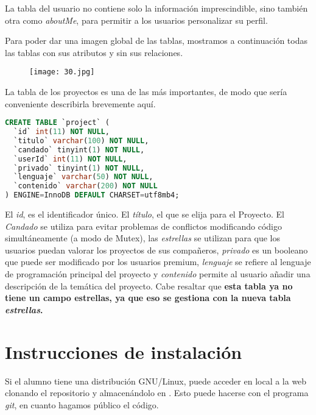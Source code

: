 \documentclass[12pt]{report}
\begin{document}
La tabla del usuario no contiene solo la información imprescindible, sino también otra como \textit{aboutMe}, para permitir a los usuarios personalizar su perfil.

Para poder dar una imagen global de las tablas, mostramos a continuación todas las tablas con sus atributos y sin sus relaciones.

\begin{figure}[!h]
 \centering
  \texttt{[image: 30.jpg]}
\end{figure}

La tabla de los proyectos es una de las más importantes, de modo que sería conveniente describirla brevemente aquí.

\begin{lstlisting}[language=SQL]
CREATE TABLE `project` (
  `id` int(11) NOT NULL,
  `titulo` varchar(100) NOT NULL,
  `candado` tinyint(1) NOT NULL,
  `userId` int(11) NOT NULL,
  `privado` tinyint(1) NOT NULL,
  `lenguaje` varchar(50) NOT NULL,
  `contenido` varchar(200) NOT NULL
) ENGINE=InnoDB DEFAULT CHARSET=utf8mb4;

\end{lstlisting}

El \textit{id}, es el identificador único. El \textit{título}, el que se elija para el Proyecto. El \textit{Candado} se utiliza para evitar problemas de conflictos modificando código simultáneamente (a modo de Mutex), las \textit{estrellas} se utilizan para que los usuarios puedan valorar los proyectos de sus compañeros, \textit{privado} es un booleano que puede ser modificado por los usuarios premium, \textit{lenguaje} se refiere al lenguaje de programación principal del proyecto y \textit{contenido} permite al usuario añadir una descripción de la temática del proyecto. Cabe resaltar que \textbf{esta tabla ya no tiene un campo estrellas, ya que eso se gestiona con la nueva tabla \textit{estrellas}.}


\section{Instrucciones de instalación}

Si el alumno tiene una distribución GNU/Linux, puede acceder en local a la web clonando el repositorio y almacenándolo en . Esto puede hacerse con el programa \textit{git}, en cuanto hagamos público el código.
\newline
\end{document}
